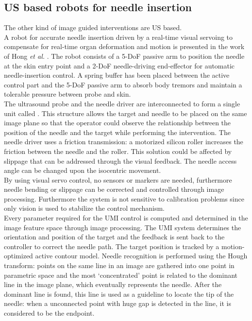 \subsection{US based robots for needle insertion}
The other kind of image guided interventions are US based.\\
A robot for accurate needle insertion driven by a real-time visual servoing to compensate for real-time organ deformation and motion is presented in the work of Hong \textit{et al.} \cite{Hong2004}.
The robot consists of a 5-DoF passive arm to position the needle at the skin entry point and a 2-DoF needle-driving end-effector for automatic needle-insertion control.
A spring buffer has been placed between the active control part and the 5-DoF passive arm to absorb body tremors and maintain a tolerable pressure between probe and skin.\\
The ultrasound probe and the needle driver are interconnected to form a single unit called . This structure allows the target and needle to be placed on the same image plane so that the operator could observe the relationship between the position of the needle and the target while performing the intervention.
The needle driver uses a friction transmission: a motorized silicon roller increases the friction between the needle and the roller. This solution could be affected by slippage that can be addressed through the visual feedback. The needle access angle can be changed upon the isocentric movement.\\
By using visual servo control, no sensors or markers are needed, furthermore needle bending or slippage can be corrected and controlled through image processing.  Furthermore the system is not sensitive to calibration problems since only vision is used to stabilize the control mechanism.\\
Every parameter required for the UMI control is computed and determined in the image feature space through image processing.
The UMI system determines the orientation and position of the target and the feedback is sent back to the controller to correct the needle path. 
The target position is tracked by a motion-optimized active contour model. Needle recognition is performed using the Hough transform: points on the same line in an image are gathered into one point in parametric space and the most ‘concentrated’ point is related to the dominant line in the image plane, which eventually represents the needle.
After the dominant line is found, this line is used as a guideline to locate the tip of the needle: when a unconnected point with huge gap is detected in the line, it is considered to be the endpoint.
